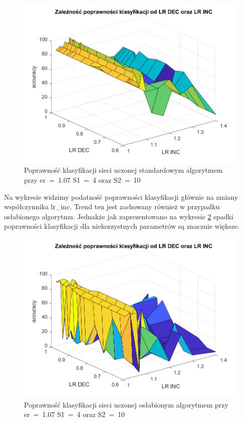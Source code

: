 \documentclass[12pt,twoside]{article}
\begin{document}
\begin{figure}[ht]
	\centering
	\includegraphics[width=16cm]{figures/Retarded_2.png}
	\caption{Poprawność klasyfikacji sieci uczonej standardowym algorytmem przy er~=~1.07 S1~=~4 oraz S2~=~10}
	\label{Fig:Retarded2}
\end{figure}
Na wykresie widzimy podatność poprawności klasyfikacji głównie na zmiany współczynnika lr\_inc.
Trend ten jest zachowany również w przypadku osłabionego algorytmu.
Jednakże jak zaprezentowano na wykresie \ref{Fig:Retarded3} spadki poprawności klasyfikacji dla niekorzystnych parametrów są znacznie większe.

\begin{figure}[ht]
	\centering
	\includegraphics[width=16cm]{figures/Retarded_3.png}
	\caption{Poprawność klasyfikacji sieci uczonej osłabionym algorytmem przy er~=~1.07 S1~=~4 oraz S2~=~10}
	\label{Fig:Retarded3}
\end{figure}
\end{document}
